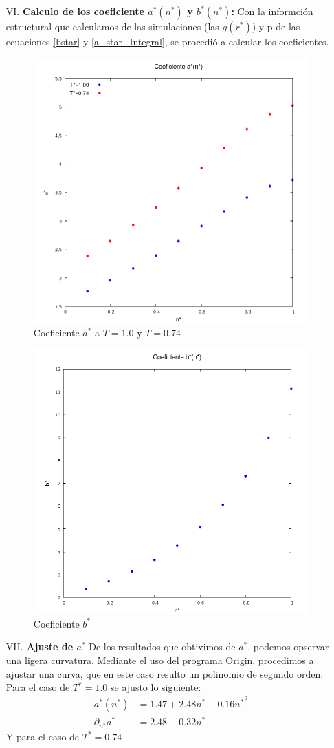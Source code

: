 \documentclass[12pt,letterpaper]{article}
\begin{document}
\begin{enumerate}
\item[VI.]\textbf{Calculo de los coeficiente $a^*(n^*)$ y $b^*(n^*)$:}
Con la informción estructural que calculamos de las simulaciones (las $g(r^*)$) y p de las ecuaciones \eqref{bstar} y \eqref{a_star_Integral}, se procedió a calcular los coeficientes.
\begin{figure}[H]
	\centering
	\includegraphics[width=0.5\linewidth]{a_star.png}
	\caption{Coeficiente $a^*$ a $T=1.0$ y $T=0.74$}
	\label{Fig:A_Star}
\end{figure}
\begin{figure}[H]
	\centering
	\includegraphics[width=0.5\linewidth]{b_star.png}
	\caption{Coeficiente $b^*$}
	\label{Fig:B_Star}
\end{figure}
 \item[VII.] \textbf{Ajuste de $a^*$ }
De los resultados que obtivimos de $a^*$, podemos opservar una ligera curvatura. Mediante el uso del programa Origin, procedimos a ajustar una curva, que en este caso resulto un polinomio de segundo orden.
Para el caso de $T^*=1.0$ se ajusto lo siguiente:
\begin{align*}
	a^*(n^*) &= 1.47 + 2.48n^* - 0.16 {n^*}^2\\
	\partial_{n^*}a^* &= 2.48 - 0.32n^*
\end{align*}
Y para el caso de $T^*=0.74$

\end{enumerate}
\end{document}
